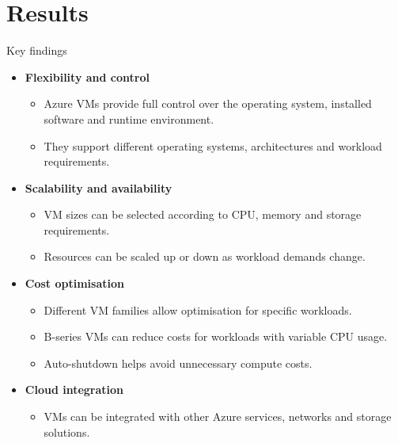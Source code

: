 \documentclass[aspectratio=169,xcolor=dvipsnames]{beamer}
\begin{document}
	\section{Results}
	\begin{frame}{Key findings}
		\begin{itemize}
			\item \textbf{Flexibility and control}
			\begin{itemize}
				\item Azure VMs provide full control over the operating system,
				installed software and runtime environment.
				\item They support different operating systems, architectures
				and workload requirements.
			\end{itemize}
			
			\item \textbf{Scalability and availability}
			\begin{itemize}
				\item VM sizes can be selected according to CPU, memory and
				storage requirements.
				\item Resources can be scaled up or down as workload demands change.
			\end{itemize}
			
			\item \textbf{Cost optimisation}
			\begin{itemize}
				\item Different VM families allow optimisation for specific workloads.
				\item B-series VMs can reduce costs for workloads with variable CPU usage.
				\item Auto-shutdown helps avoid unnecessary compute costs.
			\end{itemize}
			
			\item \textbf{Cloud integration}
			\begin{itemize}
				\item VMs can be integrated with other Azure services,
				networks and storage solutions.
			\end{itemize}
		\end{itemize}
	\end{frame}
	
\end{document}

